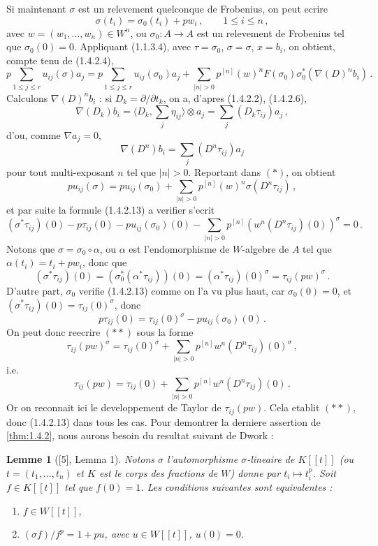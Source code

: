 \documentclass[12pt,a4paper]{article}
\theoremstyle{plain}
\newtheorem{lemma}[theorem]{Lemme}
\theoremstyle{definition}
\theoremstyle{remark}
\begin{document}
Si maintenant $\sigma$ est un relevement quelconque de Frobenius, on peut ecrire
\[
\sigma(t_i) = \sigma_0(t_i) + pw_i\,, \qquad 1 \leq i \leq n\,,
\]
avec $w = (w_1, \ldots, w_n) \in W^n$, ou $\sigma_0 : A \to A$ est un relevement de Frobenius tel que $\sigma_0(0) = 0$. Appliquant (1.1.3.4), avec $\tau = \sigma_0$, $\sigma = \sigma$, $x = b_i$, on obtient, compte tenu de (1.4.2.4),
\begin{equation}\tag{$*$}
p\sum_{1 \leq j \leq r} u_{ij}(\sigma)a_j = p\sum_{1 \leq j \leq r} u_{ij}(\sigma_0)a_j + \sum_{|n|>0} p^{[n]}(w)^n F(\sigma_0)\sigma_0^*(\nabla(D)^nb_i)\,.\end{equation}
Calculons $\nabla(D)^nb_i$ : si $D_k = \partial/\partial t_k$, on a, d'apres (1.4.2.2), (1.4.2.6),
\[
\nabla(D_k)b_i = \langle D_k, \sum_j \eta_{ij} \rangle \otimes a_j = \sum_j (D_k\tau_{ij})a_j\,,
\]
d'ou, comme $\nabla a_j = 0$,
\[
\nabla(D^n)b_i = \sum_j (D^n\tau_{ij})a_j
\]
pour tout multi-exposant $n$ tel que $|n| > 0$. Reportant dans $(*)$, on obtient
\[
pu_{ij}(\sigma) = pu_{ij}(\sigma_0) + \sum_{|n|>0} p^{[n]}(w)^n\sigma(D^n\tau_{ij})\,,
\]
et par suite la formule (1.4.2.13) a verifier s'ecrit
\begin{equation}\tag{$**$}
(\sigma^*\tau_{ij})(0) - p\tau_{ij}(0) - pu_{ij}(\sigma_0)(0) - \sum_{|n|>0} p^{[n]}(w^n(D^n\tau_{ij})(0))^\sigma = 0\,.\end{equation}
Notons que $\sigma = \sigma_0 \circ \alpha$, ou $\alpha$ est l'endomorphisme de $W$-algebre de $A$ tel que $\alpha(t_i) = t_i + pw_i$, donc que
\[
(\sigma^*\tau_{ij})(0) = (\sigma_0^*(\alpha^*\tau_{ij}))(0) = (\alpha^*\tau_{ij})(0)^\sigma = \tau_{ij}(pw)^\sigma\,.\]
D'autre part, $\sigma_0$ verifie (1.4.2.13) comme on l'a vu plus haut, car $\sigma_0(0) = 0$, et $(\sigma^*\tau_{ij})(0) = \tau_{ij}(0)^\sigma$, donc
\[
p\tau_{ij}(0) = \tau_{ij}(0)^\sigma - pu_{ij}(\sigma_0)(0)\,.\]
On peut donc reecrire $(**)$ sous la forme
\[
\tau_{ij}(pw)^\sigma = \tau_{ij}(0)^\sigma + \sum_{|n|>0} p^{[n]}w^n(D^n\tau_{ij})(0)^\sigma\,,
\]
i.e.
\[
\tau_{ij}(pw) = \tau_{ij}(0) + \sum_{|n|>0} p^{[n]}w^n(D^n\tau_{ij})(0)\,.\]
Or on reconnait ici le developpement de Taylor de $\tau_{ij}(pw)$. Cela etablit $(**)$, donc (1.4.2.13) dans tous les cas. Pour demontrer la derniere assertion de \ref{thm:1.4.2}, nous aurons besoin du resultat suivant de Dwork :

\begin{lemma}[{[5], Lemma 1}]\label{lem:1.4.3}
Notons $\sigma$ l'automorphisme $\sigma$-lineaire de $K[[t]]$ (ou $t = (t_1, \ldots, t_n)$ et $K$ est le corps des fractions de $W$) donne par $t_i \mapsto t_i^p$. Soit $f \in K[[t]]$ tel que $f(0) = 1$. Les conditions suivantes sont equivalentes :
\begin{enumerate}[label=(\roman*)]
\item $f \in W[[t]]$,
\item $(\sigma f)/f^p = 1 + pu$, avec $u \in W[[t]]$, $u(0) = 0$.
\end{enumerate}
\end{lemma}
\end{document}
